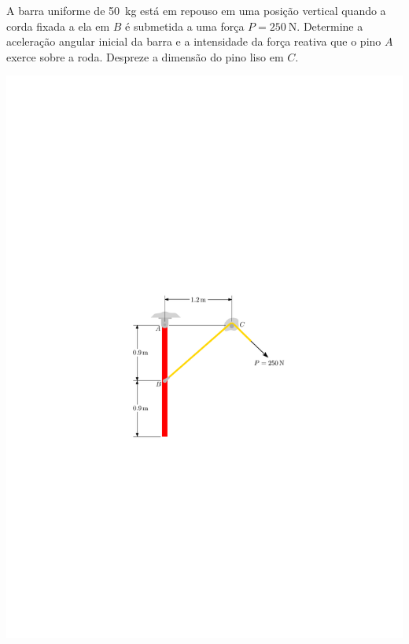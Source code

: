 \item A barra uniforme de \SI{50}{\kilogram} está em repouso em uma posição vertical quando a corda fixada a ela em $B$ é submetida a uma força $P=\SI{250}{\newton}$. Determine a aceleração angular inicial da barra e a intensidade da força reativa que o pino $A$ exerce sobre a roda. Despreze a dimensão do pino liso em $C$.


\vspace{-.6cm}
\begin{flushright}
	\includegraphics[scale=1.2]{../../images/draw_8}
\end{flushright}